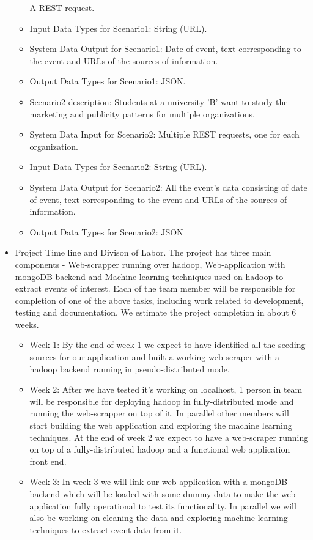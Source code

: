 \begin{itemize}
\begin{itemize}
	A REST request.
	\item{Input Data Types for Scenario1: }
	String (URL).
	\item{System Data Output for Scenario1: }
	Date of event, text corresponding to the event and URLs of the sources of information.
	\item{Output Data Types for Scenario1: }
	JSON.
	\item{Scenario2 description: }
	Students at a university 'B' want to study the marketing and publicity patterns for multiple organizations.
	\item{System Data Input for Scenario2: }
	Multiple REST requests, one for each organization.
	\item{Input Data Types for Scenario2: }
	String (URL).
	\item{System Data Output for Scenario2: }
	All the event's data consisting of date of event, text corresponding to the event and URLs of the sources of information.
	\item{Output Data Types for Scenario2: }
	JSON
	\end{itemize}
	
\item{ Project Time line and Divison of Labor.}
The project has three main components - Web-scrapper running over hadoop, Web-application with mongoDB backend and Machine learning techniques used on hadoop to extract events of interest. Each of the team member will be responsible for completion of one of the above tasks, including work related to development, testing and documentation. We estimate the project completion in about 6 weeks. 
	\begin{itemize}
	\item{ Week 1:}
	By the end of week 1 we expect to have identified all the seeding sources for our application and built a working web-scraper with a hadoop backend running in pseudo-distributed mode.
	
	\item{ Week 2:}
	After we have tested it's working on localhost, 1 person in team will be responsible for deploying hadoop in fully-distributed mode and running the web-scrapper on top of it. In parallel other members will start building the web application and exploring the machine learning techniques. At the end of week 2 we expect to have a web-scraper running on top of a fully-distributed hadoop and a functional web application front end. 
	
	\item{ Week 3:}
	In week 3 we will link our web application with a mongoDB backend which will be loaded with some dummy data to make the web application fully operational to test its functionality. In parallel we will also be working on cleaning the data and exploring machine learning techniques to extract event data from it. 
	

\end{itemize}
\end{itemize}
